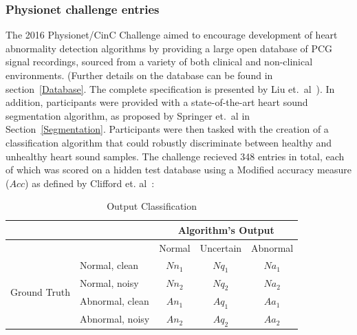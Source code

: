 \documentclass[titlepage, 12pt]{scrartcl} \usepackage{enumitem}
\begin{document}
\subsubsection{Physionet challenge entries}\label{ChallengeEnt}
\doublespacing
The 2016 Physionet/CinC Challenge aimed to encourage development of heart
abnormality detection algorithms by providing a large open database of PCG
signal recordings, sourced from a variety of both clinical and non-clinical
environments. (Further details on the database can be found in
section~\ref{Database}. The complete specification is presented by Liu et.\
al~\parencite{Liu2016}). In addition, participants were provided with a
state-of-the-art heart sound segmentation algorithm, as proposed by Springer
et.\ al in Section~\ref{Segmentation}. Participants were then tasked with the
creation of a classification algorithm that could robustly discriminate between
healthy and unhealthy heart sound samples. The challenge recieved 348 entries
in total, each of which was scored on a hidden test database
using a Modified accuracy measure ($Acc$) as defined by Clifford et.
al~\parencite{Clifford2016}:
\begin{table}[htbp]
\centering
\caption{Output Classification}
\label{OutputClassification}
\doublespacing
\begin{tabular}{llccc}
\hline
                              &                 & \multicolumn{3}{c}{Algorithm's Output}                                                    \\ \hline
                              &                 & \multicolumn{1}{l}{Normal} & \multicolumn{1}{l}{Uncertain} & \multicolumn{1}{l}{Abnormal} \\
\multirow{4}{*}{Ground Truth} & Normal, clean   & $Nn_1$                     & $Nq_1$                        & $Na_1$                       \\
                              & Normal, noisy   & $Nn_2$                     & $Nq_2$                        & $Na_2$                       \\
                              & Abnormal, clean & $An_1$                     & $Aq_1$                        & $Aa_1$                       \\
                              & Abnormal, noisy & $An_2$                     & $Aq_2$                        & $Aa_2$                       \\ \hline
\end{tabular}
\end{table}
\end{document}

